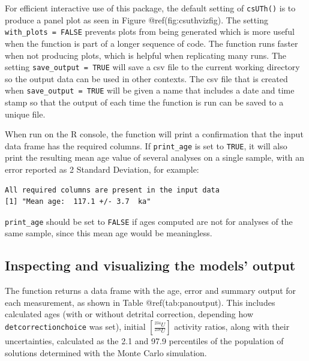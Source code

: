 \documentclass[]{elsarticle} %
\begin{document}
For efficient interactive use of this package, the default setting of \texttt{csUTh()} is to produce a panel plot as seen in Figure @ref(fig:csuthvizfig). The setting \texttt{with\_plots\ =\ FALSE} prevents plots from being generated which is more useful when the function is part of a longer sequence of code. The function runs faster when not producing plots, which is helpful when replicating many runs. The setting \texttt{save\_output\ =\ TRUE} will save a csv file to the current working directory so the output data can be used in other contexts. The csv file that is created when \texttt{save\_output\ =\ TRUE} will be given a name that includes a date and time stamp so that the output of each time the function is run can be saved to a unique file.

When run on the R console, the function will print a confirmation that the input data frame has the required columns. If \texttt{print\_age} is set to \texttt{TRUE}, it will also print the resulting mean age value of several analyses on a single sample, with an error reported as 2 Standard Deviation, for example:

\begin{verbatim}
All required columns are present in the input data
[1] "Mean age:  117.1 +/- 3.7  ka"
\end{verbatim}

\texttt{print\_age} should be set to \texttt{FALSE} if ages computed are not for analyses of the same sample, since this mean age would be meaningless.

\hypertarget{inspecting-and-visualizing-the-models-output}{%
\subsection{Inspecting and visualizing the models' output}\label{inspecting-and-visualizing-the-models-output}}

The function returns a data frame with the age, error and summary output for each measurement, as shown in Table @ref(tab:panoutput). This includes calculated ages (with or without detrital correction, depending how \texttt{detcorrectionchoice} was set), initial \([\frac{^{234}U}{^{238}U}]\) activity ratios, along with their uncertainties, calculated as the 2.1 and 97.9 percentiles of the population of solutions determined with the Monte Carlo simulation.
\end{document}
